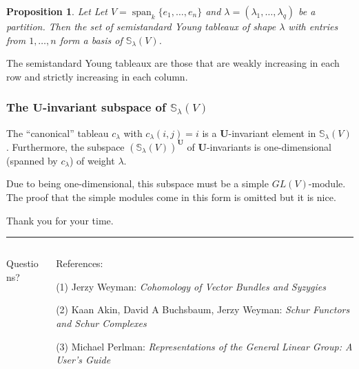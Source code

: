 \documentclass[mathserif]{beamer}
\DeclareMathOperator{\Span}{span}
\newtheorem*{proposition}{Proposition}
\begin{document}
%
\begin{frame}

    \begin{proposition}
        Let Let $V = \Span_k\{e_1,\dots,e_n\}$ and $\lambda = (\lambda_1,\dots,\lambda_q)$ be a partition. Then the set of semistandard Young tableaux of shape $\lambda$ with entries from $1,\dots,n$ form a basis of $\mathbb{S}_\lambda(V)$.
    \end{proposition}

    The semistandard Young tableaux are those that are weakly increasing in each row and strictly increasing in each column.

\end{frame}

%
\begin{frame}
    \frametitle{The $\mathbf{U}$-invariant subspace of $\mathbb{S}_\lambda(V)$}

    The ``canonical'' tableau $c_\lambda$ with $c_\lambda(i,j) = i$ is a $\mathbf{U}$-invariant element in $\mathbb{S}_\lambda(V)$. Furthermore, the subspace $(\mathbb{S}_\lambda(V))^{\mathbf{U}}$ of $\mathbf{U}$-invariants is one-dimensional (spanned by $c_\lambda$) of weight $\lambda$.

    Due to being one-dimensional, this subspace must be a simple $GL(V)$-module. The proof that the simple modules come in this form is omitted but it is nice.

\end{frame}

%
\begin{frame}
    \begin{flushright}
        {\color{black!15!pastelblue}Thank you for your time.}
        \end{flushright}
        \hrule
    \begin{columns}
    \begin{column}{0.3\textwidth}
        \begin{block}{}{
        \begin{center}\Large  Questions?\end{center}}
        \end{block}\vspace{0em}
    \end{column}
    \begin{column}{0.7\textwidth}
        \begin{block}{}{
        \begin{center}\Large  References:\end{center}}
    \end{block}
(1) Jerzy Weyman: \textit{Cohomology of Vector Bundles and Syzygies}

(2) Kaan Akin, David A Buchsbaum, Jerzy Weyman: \textit{Schur Functors and Schur Complexes}

(3) Michael Perlman: \textit{Representations of the General Linear Group: A User's Guide}
    \end{column}
    \end{columns}
\end{frame}
\end{document}

